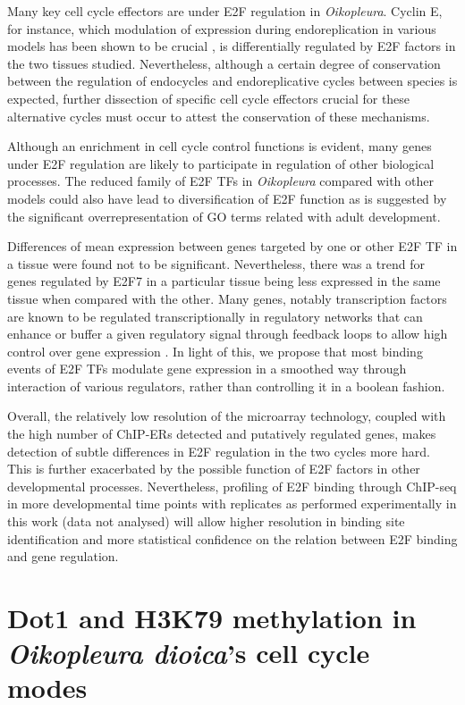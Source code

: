\documentclass[11pt,twoside,a4paper]{report}
\begin{document}
Many key cell cycle effectors are under E2F regulation in \textit{Oikopleura}. Cyclin E, for instance, which modulation of expression during endoreplication in various models has been shown to be crucial \cite{Lilly2005}\cite{Narbonne-Reveau2008}\cite{Eliades2010}, is differentially regulated by E2F factors in the two tissues studied. Nevertheless, although a certain degree of conservation between the regulation of endocycles and endoreplicative cycles between species is expected, further dissection of specific cell cycle effectors crucial for these alternative cycles must occur to attest the conservation of these mechanisms.

Although an enrichment in cell cycle control functions is evident, many genes under E2F regulation are likely to participate in regulation of other biological processes. The reduced family of E2F TFs in \textit{Oikopleura} compared with other models could also have lead to diversification of E2F function as is suggested by the significant overrepresentation of GO terms related with adult development. 

Differences of mean expression between genes targeted by one or other E2F TF in a tissue were found not to be significant. Nevertheless, there was a trend for genes regulated by E2F7 in a particular tissue being less expressed in the same tissue when compared with the other. Many genes, notably transcription factors are known to be regulated transcriptionally in regulatory networks that can enhance or buffer a given regulatory signal through feedback loops to allow high control over gene expression \cite{Macneil2011}. In light of this, we propose that most binding events of E2F TFs modulate gene expression in a smoothed way through interaction of various regulators, rather than controlling it in a boolean fashion.

Overall, the relatively low resolution of the microarray technology, coupled with the high number of ChIP-ERs detected and putatively regulated genes, makes detection of subtle differences in E2F regulation in the two cycles more hard. This is further exacerbated by the possible function of E2F factors in other developmental processes. Nevertheless, profiling of E2F binding through ChIP-seq in more developmental time points with replicates as performed experimentally in this work (data not analysed) will allow higher resolution in binding site identification and more statistical confidence on the relation between E2F binding and gene regulation.

\section{Dot1 and H3K79 methylation in \textit{Oikopleura dioica}'s cell cycle modes}
\end{document}
